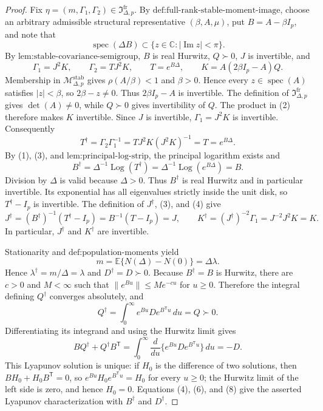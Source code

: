 \documentclass{article}
\begin{document}
\begin{proof}
Fix \(\eta=(m,\Gamma_1,\Gamma_2)\in\mathfrak I_{\Delta,p}^{\mathrm{fr}}\).  By \(\text{def:full-rank-stable-moment-image}\), choose an arbitrary admissible structural representative \((\beta,A,\mu)\), put \(B=A-\beta I_p\), and note that
\[
 \operatorname{spec}(\Delta B)\subset
 \{z\in\mathbb C:|\operatorname{Im}z|<\pi\}.
\tag{1}
\]
By \(\text{lem:stable-covariance-semigroup}\), \(B\) is real Hurwitz, \(Q\succ0\), \(J\) is invertible, and
\[
 \Gamma_1=J^2K,\qquad \Gamma_2=TJ^2K,\qquad
 T=e^{B\Delta},\qquad K=A(2\beta I_p-A)Q.
\tag{2}
\]
Membership in \(\mathcal M_{\Delta,p}^{\mathrm{stab}}\) gives \(\rho(A/\beta)<1\) and \(\beta>0\).  Hence every \(z\in\operatorname{spec}(A)\) satisfies \(|z|<\beta\), so \(2\beta-z\neq0\).  Thus \(2\beta I_p-A\) is invertible.  The definition of \(\mathfrak I_{\Delta,p}^{\mathrm{fr}}\) gives \(\det(A)\neq0\), while \(Q\succ0\) gives invertibility of \(Q\).  The product in (2) therefore makes \(K\) invertible.  Since \(J\) is invertible, \(\Gamma_1=J^2K\) is invertible.  Consequently
\[
 T^\dagger=\Gamma_2\Gamma_1^{-1}
 =TJ^2K(J^2K)^{-1}=T=e^{B\Delta}.
\tag{3}
\]
By (1), (3), and \(\text{lem:principal-log-strip}\), the principal logarithm exists and
\[
 B^\dagger=\Delta^{-1}\operatorname{Log}(T^\dagger)
 =\Delta^{-1}\operatorname{Log}(e^{B\Delta})=B.
\tag{4}
\]
Division by \(\Delta\) is valid because \(\Delta>0\).  Thus \(B^\dagger\) is real Hurwitz and in particular invertible.  Its exponential has all eigenvalues strictly inside the unit disk, so \(T^\dagger-I_p\) is invertible.  The definition of \(J^\dagger\), (3), and (4) give
\[
 J^\dagger=(B^\dagger)^{-1}(T^\dagger-I_p)
 =B^{-1}(T-I_p)=J,
 \qquad
 K^\dagger=(J^\dagger)^{-2}\Gamma_1=J^{-2}J^2K=K.
\tag{5}
\]
In particular, \(J^\dagger\) and \(K^\dagger\) are invertible.

Stationarity and \(\text{def:population-moments}\) yield
\[
 m=\mathbb E\{N(\Delta)-N(0)\}=\Delta\lambda.
\tag{6}
\]
Hence \(\lambda^\dagger=m/\Delta=\lambda\) and \(D^\dagger=D\succ0\).  Because \(B^\dagger=B\) is Hurwitz, there are \(c>0\) and \(M<\infty\) such that \(\|e^{Bu}\|\leq Me^{-cu}\) for \(u\geq0\).  Therefore the integral defining \(Q^\dagger\) converges absolutely, and
\[
 Q^\dagger=\int_0^\infty e^{Bu}De^{B^{\mathsf T}u}\,du=Q\succ0.
\tag{7}
\]
Differentiating its integrand and using the Hurwitz limit gives
\[
 BQ^\dagger+Q^\dagger B^{\mathsf T}
 =\int_0^\infty\frac{d}{du}
   \{e^{Bu}De^{B^{\mathsf T}u}\}\,du=-D.
\tag{8}
\]
This Lyapunov solution is unique: if \(H_0\) is the difference of two solutions, then \(BH_0+H_0B^{\mathsf T}=0\), so \(e^{Bu}H_0e^{B^{\mathsf T}u}=H_0\) for every \(u\geq0\); the Hurwitz limit of the left side is zero, and hence \(H_0=0\).  Equations (4), (6), and (8) give the asserted Lyapunov characterization with \(B^\dagger\) and \(D^\dagger\).


\end{proof}
\end{document}
